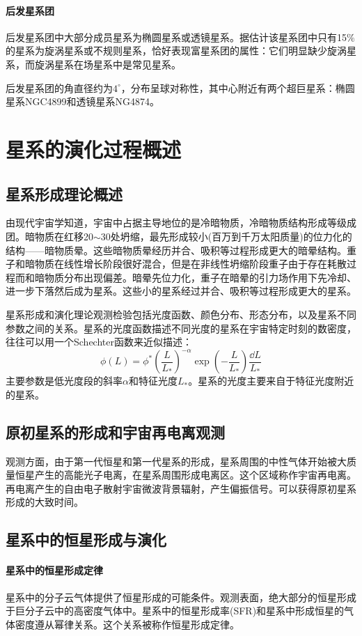 \paragraph{后发星系团}后发星系团中大部分成员星系为椭圆星系或透镜星系。据估计该星系团中只有15$\%$的星系为旋涡星系或不规则星系，恰好表现富星系团的属性：它们明显缺少旋涡星系，而旋涡星系在场星系中是常见星系。

后发星系团的角直径约为$4^\circ$，分布呈球对称性，其中心附近有两个超巨星系：椭圆星系NGC4899和透镜星系NG4874。
\section{星系的演化过程概述}
\subsection{星系形成理论概述}由现代宇宙学知道，宇宙中占据主导地位的是冷暗物质，冷暗物质结构形成等级成团。暗物质在红移20$\sim$30处坍缩，最先形成较小(百万到千万太阳质量)的位力化的结构——暗物质晕。这些暗物质晕经历并合、吸积等过程形成更大的暗晕结构。重子和暗物质在线性增长阶段很好混合，但是在非线性坍缩阶段重子由于存在耗散过程而和暗物质分布出现偏差。暗晕先位力化，重子在暗晕的引力场作用下先冷却、进一步下落然后成为星系。这些小的星系经过并合、吸积等过程形成更大的星系。

星系形成和演化理论观测检验包括光度函数、颜色分布、形态分布，以及星系不同参数之间的关系。星系的光度函数描述不同光度的星系在宇宙特定时刻的数密度，往往可以用一个Schechter函数来近似描述：
\begin{equation}
	\phi(L)=\phi^{*}\left(\frac{L}{L_{*}}\right)^{-\alpha}\exp\left(-\frac{L}{L_{*}}\right)\frac{\dd L}{L_{*}}
\end{equation}
主要参数是低光度段的斜率$\alpha$和特征光度$L_{*}$。星系的光度主要来自于特征光度附近的星系。
\subsection{原初星系的形成和宇宙再电离观测}观测方面，由于第一代恒星和第一代星系的形成，星系周围的中性气体开始被大质量恒星产生的高能光子电离，在星系周围形成电离区。这个区域称作宇宙再电离。再电离产生的自由电子散射宇宙微波背景辐射，产生偏振信号。可以获得原初星系形成的大致时间。
\subsection{星系中的恒星形成与演化}
\paragraph{星系中的恒星形成定律}星系中的分子云气体提供了恒星形成的可能条件。观测表面，绝大部分的恒星形成于巨分子云中的高密度气体中。星系中的恒星形成率(SFR)和星系中形成恒星的气体密度遵从幂律关系。这个关系被称作恒星形成定律。

